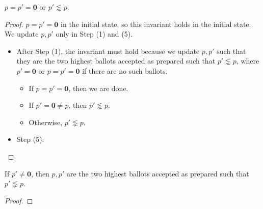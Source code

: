 \begin{thm}
    $p = p' = \textbf{0}$ or $p' \lnsim p$.
\end{thm}

\begin{proof}
    $p = p' = \textbf{0}$ in the initial state, so this invariant holds in the initial state.
    We update $p, p'$ only in Step (1) and (5).
    \begin{itemize}
        \item
            After Step (1), the invariant must hold because we update $p, p'$ such that they are the two highest ballots accepted as prepared such that $p' \lnsim p$, where $p' = \textbf{0}$ or $p = p' = \textbf{0}$ if there are no such ballots.
            \begin{itemize}
                \item
                    If $p = p' = \textbf{0}$, then we are done.
                \item
                    If $p' = \textbf{0} \ne p$, then $p' \lnsim p$.
                \item
                    Otherwise, $p' \lnsim p$.
            \end{itemize}
        \item
            Step (5):
    \end{itemize}
\end{proof}

\begin{thm}
    If $p' \ne \textbf{0}$, then $p, p'$ are the two highest ballots accepted as prepared such that $p' \lnsim p$.
\end{thm}

\begin{proof}
\end{proof}
